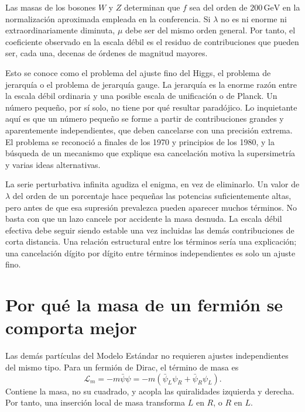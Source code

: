 Las masas de los bosones \(W\) y \(Z\) determinan que \(f\) sea del orden de \(200\,\mathrm{GeV}\) en la normalización aproximada empleada en la conferencia. Si \(\lambda\) no es ni enorme ni extraordinariamente diminuta, \(\mu\) debe ser del mismo orden general. Por tanto, el coeficiente observado en la escala débil es el residuo de contribuciones que pueden ser, cada una, decenas de órdenes de magnitud mayores.

Esto se conoce como el problema del ajuste fino del Higgs, el problema de jerarquía o el problema de jerarquía gauge. La jerarquía es la enorme razón entre la escala débil ordinaria y una posible escala de unificación o de Planck. Un número pequeño, por sí solo, no tiene por qué resultar paradójico. Lo inquietante aquí es que un número pequeño se forme a partir de contribuciones grandes y aparentemente independientes, que deben cancelarse con una precisión extrema. El problema se reconoció a finales de los 1970 y principios de los 1980, y la búsqueda de un mecanismo que explique esa cancelación motiva la supersimetría y varias ideas alternativas.

La serie perturbativa infinita agudiza el enigma, en vez de eliminarlo. Un valor de \(\lambda\) del orden de un porcentaje hace pequeñas las potencias suficientemente altas, pero antes de que esa supresión prevalezca pueden aparecer muchos términos. No basta con que un lazo cancele por accidente la masa desnuda. La escala débil efectiva debe seguir siendo estable una vez incluidas las demás contribuciones de corta distancia. Una relación estructural entre los términos sería una explicación; una cancelación dígito por dígito entre términos independientes es solo un ajuste fino.

\section{Por qué la masa de un fermión se comporta mejor}

Las demás partículas del Modelo Estándar no requieren ajustes independientes del mismo tipo. Para un fermión de Dirac, el término de masa es
\begin{equation}
\mathcal L_m=-m\bar\psi\psi
=-m\left(\bar\psi_L\psi_R+\bar\psi_R\psi_L\right).
\label{eq:fermion-mass}
\end{equation}
Contiene la masa, no su cuadrado, y acopla las quiralidades izquierda y derecha. Por tanto, una inserción local de masa transforma \(L\) en \(R\), o \(R\) en \(L\).


